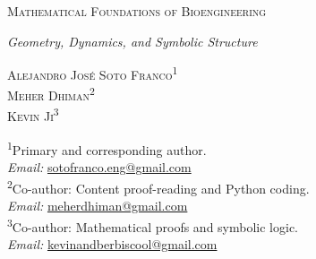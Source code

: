 





\thispagestyle{empty}

\begin{center}
\vspace*{2.5cm}

{\fontsize{18pt}{20pt}\selectfont\scshape
Mathematical Foundations of Bioengineering\par}
\vspace{0.5cm}
{\large\itshape Geometry, Dynamics, and Symbolic Structure\par}

\vspace{1.8cm}

{\normalsize
\textsc{Alejandro Jos\'e Soto Franco}\textsuperscript{1} \\
\textsc{Meher Dhiman}\textsuperscript{2} \\
\textsc{Kevin Ji}\textsuperscript{3} \\
}

\vspace{1.5cm}
\end{center}

{\scriptsize
\begin{flushleft}
\textsuperscript{1}Primary and corresponding author.\\ \hspace*{1.5em}\textit{Email:} \href{mailto:sotofranco.eng@gmail.com}{sotofranco.eng@gmail.com} \\
\textsuperscript{2}Co-author: Content proof-reading and Python coding.\\
 \hspace*{1.5em}\textit{Email:} \href{mailto:meherdhiman@gmail.com}{meherdhiman@gmail.com} \\
\textsuperscript{3}Co-author: Mathematical proofs and symbolic logic.\\
 \hspace*{1.5em}\textit{Email:} \href{mailto:kevinandberbiscool@gmail.com}{kevinandberbiscool@gmail.com} \\
\end{flushleft}
}

